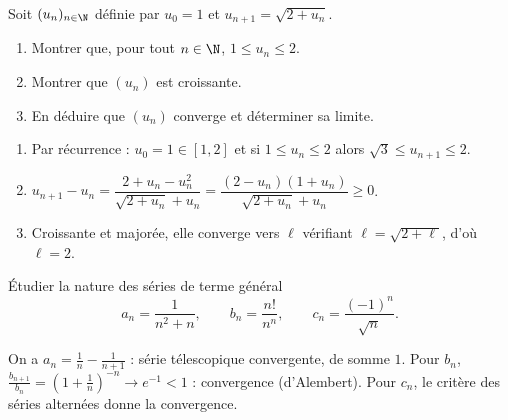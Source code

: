 
\begin{exercice}
Soit $(u_n)_{n\in\N}$ définie par $u_0=1$ et $u_{n+1}=\sqrt{2+u_n}$.
\begin{enumerate}
  \item Montrer que, pour tout $n\in\N$, $1\le u_n\le 2$.
  \item Montrer que $(u_n)$ est croissante.
  \item En déduire que $(u_n)$ converge et déterminer sa limite.
\end{enumerate}
\begin{correction}
\begin{enumerate}
  \item Par récurrence : $u_0=1\in[1,2]$ et si $1\le u_n\le 2$ alors $\sqrt3\le u_{n+1}\le 2$.
  \item $u_{n+1}-u_n=\dfrac{2+u_n-u_n^2}{\sqrt{2+u_n}+u_n}=\dfrac{(2-u_n)(1+u_n)}{\sqrt{2+u_n}+u_n}\ge 0$.
  \item Croissante et majorée, elle converge vers $\ell$ vérifiant $\ell=\sqrt{2+\ell}$, d'où $\ell=2$.
\end{enumerate}
\end{correction}
\end{exercice}

\begin{exercice}
Étudier la nature des séries de terme général
\[
  a_n=\frac{1}{n^2+n},\qquad b_n=\frac{n!}{n^n},\qquad c_n=\frac{(-1)^n}{\sqrt{n}} .
\]
\begin{correction}
On a $a_n=\frac1n-\frac1{n+1}$ : série télescopique convergente, de somme $1$. Pour $b_n$, $\frac{b_{n+1}}{b_n}=\left(1+\frac1n\right)^{-n}\to e^{-1}<1$ : convergence (d'Alembert). Pour $c_n$, le critère des séries alternées donne la convergence.
\end{correction}
\end{exercice}
